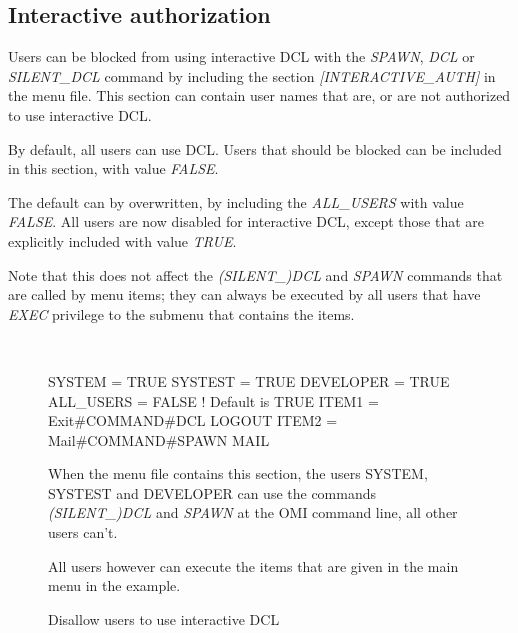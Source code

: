 \documentclass[a4paper]{book}
\newcommand{\vs}{\vspace{3mm}}
\renewcommand{\indent}{\hspace*{5mm}}
\begin{document}
\subsection{Interactive authorization}
\index{{\$}}
\label{subsubsec:interactive}

Users can be blocked from using interactive DCL with the \textsl{SPAWN}, \textsl{DCL} or  
\textsl{SILENT{\_}DCL} command by including the section \textsl{[INTERACTIVE{\_}AUTH]} in 
the menu file. This section can contain user names that are, or are not 
authorized to use interactive DCL.

\vs

By default, all users can use DCL. Users that should be blocked can be 
included in this section, with value \textsl{FALSE}.

The default can by overwritten, by including the \textsl{ALL{\_}USERS} with value 
\textsl{FALSE}. All users are now disabled for interactive DCL, except those that are 
explicitly included with value \textsl{TRUE}.

\vs

Note that this does not affect the \textsl{(SILENT{\_})DCL} and \textsl{SPAWN} commands that 
are called by menu items; they can always be executed by all users that have 
\textsl{EXEC} privilege to the submenu that contains the items.

\begin{figure}[ht]
\begin{minipage}[t]{\textwidth}
\hrulefill \\
\begin{ttfamily}
 \newline
\indent SYSTEM = TRUE \newline
\indent SYSTEST = TRUE \newline
\indent DEVELOPER = TRUE \newline
\indent ALL{\_}USERS = FALSE ! Default is TRUE \newline
 \newline
{} \newline
\indent ITEM1 = Exit{\#}COMMAND{\#}DCL LOGOUT \newline
\indent ITEM2 = Mail{\#}COMMAND{\#}SPAWN MAIL \newline
\end{ttfamily}

\noindent When the menu file contains this section, the users SYSTEM, SYSTEST and 
DEVELOPER can use the commands \textsl{(SILENT{\_})DCL} and \textsl{SPAWN} at the OMI command 
line, all other users can't.

All users however can execute the items that are given in the main menu in 
the example. 
\caption{Disallow users to use interactive DCL}\label{fig:disallowdcl}
\hrulefill
\end{minipage}
\end{figure}
\end{document}
